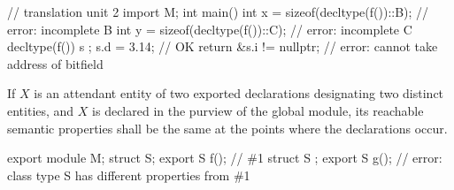 \begin{std.txt}
\begin{before}
\begin{example}
\begin{codeblock}
      // translation unit 2
      import M;
      int main() {
        int x = sizeof(decltype(f())::B);   // error: incomplete B
        int y = sizeof(decltype(f())::C);   // error: incomplete C
        decltype(f()) s { };
        s.d = 3.14;                         // OK
        return &s.i != nullptr;             // error: cannot take address of bitfield
      }
    \end{codeblock}
  \end{example}
\end{before}\begin{before}\color{addclr}
  \alinea
  If $X$ is an attendant entity of two exported declarations
  designating two distinct entities,
  and $X$ is declared in the purview of the global module,
  its reachable semantic properties shall
  be the same at the points where the declarations occur.
  \begin{example}
    \begin{codeblock}
      export module M;
      struct S;
      export S f();     // \#1
      struct S { };
      export S g();     // error: class type S has different properties from \#1
    \end{codeblock}
  \end{example}
  
\end{before}
\end{std.txt}
